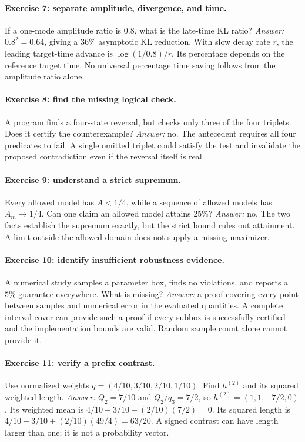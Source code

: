 \paragraph{Exercise 7: separate amplitude, divergence, and time.}
If a one-mode amplitude ratio is $0.8$, what is the late-time KL ratio?
\emph{Answer:} $0.8^2=0.64$, giving a $36\%$ asymptotic KL reduction.
With slow decay rate $r$, the leading target-time advance is
$\log(1/0.8)/r$. Its percentage depends on the reference target time.
No universal percentage time saving follows from the amplitude ratio alone.

\paragraph{Exercise 8: find the missing logical check.}
A program finds a four-state reversal, but checks only three of the four
triplets. Does it certify the counterexample? \emph{Answer:} no. The
antecedent requires all four predicates to fail. A single omitted triplet
could satisfy the test and invalidate the proposed contradiction even if
the reversal itself is real.

\paragraph{Exercise 9: understand a strict supremum.}
Every allowed model has $A<1/4$, while a sequence of allowed models has
$A_m\to1/4$. Can one claim an allowed model attains $25\%$?
\emph{Answer:} no. The two facts establish the supremum exactly, but the
strict bound rules out attainment. A limit outside the allowed domain
does not supply a missing maximizer.

\paragraph{Exercise 10: identify insufficient robustness evidence.}
A numerical study samples a parameter box, finds no violations, and reports
a $5\%$ guarantee everywhere. What is missing? \emph{Answer:} a proof
covering every point between samples and numerical error in the evaluated
quantities. A complete interval cover can provide such a proof if every
subbox is successfully certified and the implementation bounds are valid.
Random sample count alone cannot provide it.


\paragraph{Exercise 11: verify a prefix contrast.}
Use normalized weights $q=(4/10,3/10,2/10,1/10)$.
Find $h^{(2)}$ and its squared weighted length.
\emph{Answer:} $Q_2=7/10$ and $Q_2/q_3=7/2$, so
$h^{(2)}=(1,1,-7/2,0)$. Its weighted mean is
$4/10+3/10-(2/10)(7/2)=0$. Its squared length is
$4/10+3/10+(2/10)(49/4)=63/20$. A signed contrast can have length larger
than one; it is not a probability vector.

